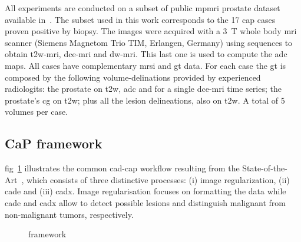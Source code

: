 \documentclass[a4paper,num-refs]{wiley-article}
\begin{document}
All experiments are conducted on a subset of public \ac{mpmri} prostate dataset
available in~\citep{lemaitre2016dce}. The subset used in this work corresponds
to the 17 \ac{cap} cases proven positive by biopsy. The images were acquired
with a \SI{3}{\tesla} whole body \ac{mri} scanner (Siemens Magnetom Trio TIM,
Erlangen, Germany) using sequences to obtain \ac{t2w}-\ac{mri},
\ac{dce}-\ac{mri} and \ac{dw}-\ac{mri}. This last one is used to compute the
\ac{adc} maps. All cases have complementary \ac{mrsi} and \ac{gt} data.
%
For each case the \ac{gt} is composed by the following volume-delinations
provided by experienced radiologits: the prostate on \ac{t2w}, \ac{adc} and for
a single \ac{dce}-\ac{mri} time series; the prostate's \ac{cg} on \ac{t2w}; plus
all the lesion delineations, also on \ac{t2w}. A total of 5 volumes per case.


\subsection{CaP framework} \label{sec:framework}

\Acl{fig}~\ref{fig:wkfcad} illustrates the common \ac{cad}-\ac{cap} workflow
resulting from the State-of-the-Art~\cite{lemaitre2015computer}, which 
consists of three distinctive processes: (i) image regularization, (ii)
\ac{cade} and (iii) \ac{cadx}. Image regularisation focuses on formatting the data
while \ac{cade} and \ac{cadx} allow to detect possible lesions and distinguish
malignant from non-malignant tumors, respectively.

\begin{figure}
  \centering

\caption{framework}
\label{fig:wkfcad}
\end{figure}
\end{document}
